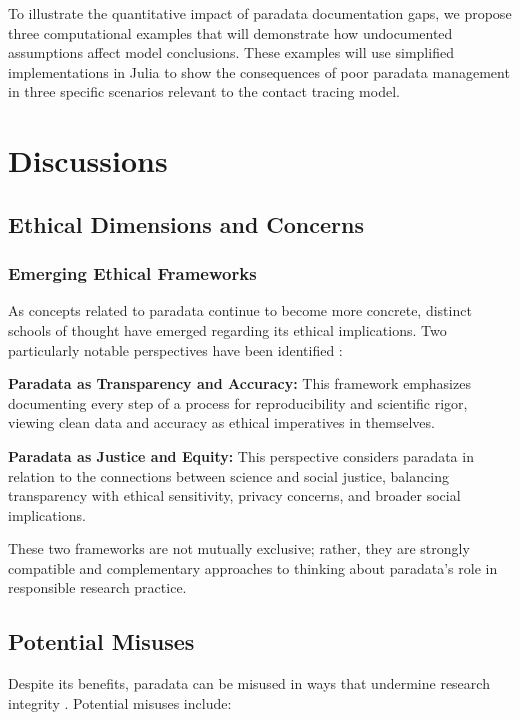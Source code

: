 To illustrate the quantitative impact of paradata documentation gaps, we propose three computational examples that will demonstrate how undocumented assumptions affect model conclusions.
These examples will use simplified implementations in Julia to show the consequences of poor paradata management in three specific scenarios relevant to the contact tracing model.

\section{Discussions}    

\subsection{Ethical Dimensions and Concerns}

\subsubsection{Emerging Ethical Frameworks}
As concepts related to paradata continue to become more concrete, distinct schools of thought have emerged regarding its ethical implications. Two particularly notable perspectives have been identified \cite{mickel2023cultural}:

\textbf{Paradata as Transparency and Accuracy:} This framework emphasizes documenting every step of a process for reproducibility and scientific rigor, viewing clean data and accuracy as ethical imperatives in themselves.

\textbf{Paradata as Justice and Equity:} This perspective considers paradata in relation to the connections between science and social justice, balancing transparency with ethical sensitivity, privacy concerns, and broader social implications.

These two frameworks are not mutually exclusive; rather, they are strongly compatible and complementary approaches to thinking about paradata's role in responsible research practice.

\subsection{Potential Misuses}
            
Despite its benefits, paradata can be misused in ways that undermine research integrity \cite{huvila_perspectives_2024}. Potential misuses include:

